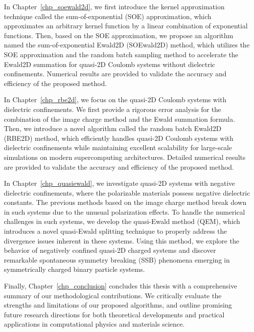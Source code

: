 In Chapter~\ref{chp_soewald2d}, we first introduce the kernel approximation technique called the sum-of-exponential (SOE) approximation, which approximates an arbitrary kernel function by a linear combination of exponential functions.
Then, based on the SOE approximation, we propose an algorithm named the sum-of-exponential Ewald2D (SOEwald2D) method, which utilizes the SOE approximation and the random batch sampling method to accelerate the Ewald2D summation for quasi-2D Coulomb systems without dielectric confinements.
Numerical results are provided to validate the accuracy and efficiency of the proposed method.

In Chapter~\ref{chp_rbe2d}, we focus on the quasi-2D Coulomb systems with dielectric confinements.
We first provide a rigorous error analysis for the combination of the image charge method and the Ewald summation formula.
Then, we introduce a novel algorithm called the random batch Ewald2D (RBE2D) method, which efficiently handles quasi-2D Coulomb systems with dielectric confinements while maintaining excellent scalability for large-scale simulations on modern supercomputing architectures.
Detailed numerical results are provided to validate the accuracy and efficiency of the proposed method.

In Chapter~\ref{chp_quasiewald}, we investigate quasi-2D systems with negative dielectric confinements, where the polarizable materials possess negative dielectric constants.
The previous methods based on the image charge method break down in such systems due to the unusual polarization effects.
To handle the numerical challenges in such systems, we develop the quasi-Ewald method (QEM), which introduces a novel quasi-Ewald splitting technique to properly address the divergence issues inherent in these systems. 
Using this method, we explore the behavior of negatively confined quasi-2D charged systems and discover remarkable spontaneous symmetry breaking (SSB) phenomena emerging in symmetrically charged binary particle systems.

Finally, Chapter~\ref{chp_conclusion} concludes this thesis with a comprehensive summary of our methodological contributions. 
We critically evaluate the strengths and limitations of our proposed algorithms, and outline promising future research directions for both theoretical developments and practical applications in computational physics and materials science.